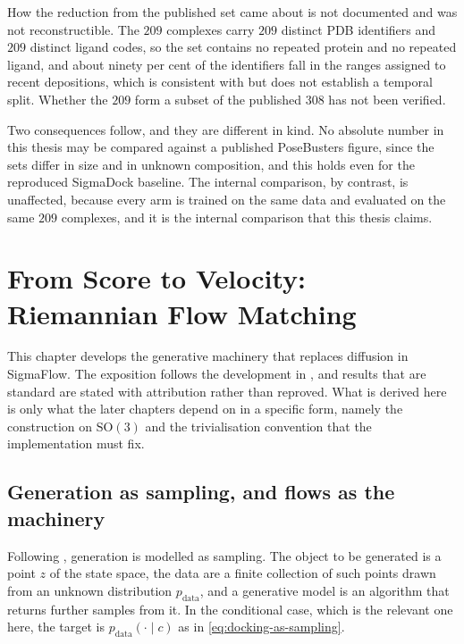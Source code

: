 \documentclass[11pt,a4paper]{report}
\theoremstyle{plain}
\theoremstyle{definition}
\theoremstyle{remark}
\newif\ifdraftmode
\newcommand{\dnote}[2]{\ifdraftmode{\sffamily\small\color{DraftBlue}\textbf{[#1]}\ #2}\fi}
\newcommand{\SOthree}{\mathrm{SO}(3)}
\newcommand{\ctx}{c}
\begin{document}
How the reduction from the published set came about is not documented and was
not reconstructible. The $209$ complexes carry $209$ distinct PDB identifiers
and $209$ distinct ligand codes, so the set contains no repeated protein and no
repeated ligand, and about ninety per cent of the identifiers fall in the
ranges assigned to recent depositions, which is consistent with but does not
establish a temporal split. Whether the $209$ form a subset of the published
$308$ has not been verified.

Two consequences follow, and they are different in kind. No absolute number in
this thesis may be compared against a published PoseBusters figure, since the
sets differ in size and in unknown composition, and this holds even for the
reproduced SigmaDock baseline. The internal comparison, by contrast, is
unaffected, because every arm is trained on the same data and evaluated on the
same $209$ complexes, and it is the internal comparison that this thesis
claims.

\dnote{OPEN}{Settling whether the $209$ are a subset of the published $308$
requires only the official identifier list. If they are a strict subset the
matter is closed with one sentence; if they are not, the composition of the
evaluation set needs to be characterised before any external comparison is
attempted.}

\chapter{From Score to Velocity: Riemannian Flow Matching}
\label{ch:theory}

This chapter develops the generative machinery that replaces diffusion in
SigmaFlow. The exposition follows the development in
\citet{holderrieth2025flowmatching}, and results that are standard are stated
with attribution rather than reproved. What is derived here is only what the
later chapters depend on in a specific form, namely the construction on
$\SOthree$ and the trivialisation convention that the implementation must fix.

\section{Generation as sampling, and flows as the machinery}

Following \citet{holderrieth2025flowmatching}, generation is modelled as
sampling. The object to be generated is a point $z$ of the state space, the
data are a finite collection of such points drawn from an unknown distribution
$p_{\mathrm{data}}$, and a generative model is an algorithm that returns
further samples from it. In the conditional case, which is the relevant one
here, the target is $p_{\mathrm{data}}(\cdot\mid\ctx)$ as in
\eqref{eq:docking-as-sampling}.
\end{document}
